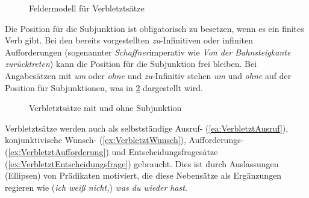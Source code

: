 \begin{figure}[!htbp]
  \centering
  \caption{Feldermodell für Verbletztsätze}
  \label{fig:Verbletztfelder}
\end{figure}

Die Position für die Subjunktion ist obligatorisch zu besetzen, wenn es ein finites Verb gibt. Bei den bereits vorgestellten \textit{zu}-Infinitiven oder infiniten Aufforderungen (sogenannter \textit{Schaffner}imperativ wie \textit{Von der Bahnsteigkante zurücktreten}) kann die Position für die Subjunktion frei bleiben. Bei Angabesätzen mit \textit{um} oder \textit{ohne} und \textit{zu}-Infinitiv stehen \textit{um} und \textit{ohne} auf der Position für Subjunktionen, was in \ref{fig:VerbletztmitohneSubjunktion} dargestellt wird.

\begin{figure}[!htbp]
  \centering
  \caption{Verbletztsätze mit und ohne Subjunktion}
  \label{fig:VerbletztmitohneSubjunktion}
\end{figure}

Verbletztsätze werden auch als selbstständige Ausruf- (\ref{ea:VerbletztAusruf}), konjunktivische Wunsch- (\ref{ex:VerbletztWunsch}), Aufforderungs- (\ref{ex:VerbletztAufforderung}) und Entscheidungsfragesätze (\ref{ex:VerbletztEntscheidungsfrage}) gebraucht. Dies ist durch Auslassungen (Ellipsen) von Prädikaten motiviert, die diese Nebensätze als Ergänzungen regieren wie (\textit{ich weiß nicht,}) \textit{was du wieder hast}. 

